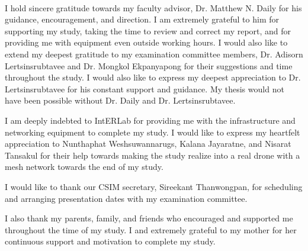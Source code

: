 
\setlength{\parindent}{0pt}
\setlength{\parskip}{1em}
\setlength{\baselineskip}{1.2em} %

\begin{center}
  \fontsize{14}{17} \\
\end{center}
\vspace{36pt} 

I hold sincere gratitude towards my faculty advisor, Dr. Matthew N. Daily for his guidance, encouragement, and direction. I am extremely grateful to him for supporting my study, taking the time to review and correct my report, and for providing me with equipment even outside working hours. I would also like to extend my deepest gratitude to my examination committee members, Dr. Adisorn Lertsinsrubtavee and Dr.  Mongkol Ekpanyapong for their suggestions and time throughout the study. I would also like to express my deepest appreciation to Dr. Lertsinsrubtavee for his constant support and guidance. My thesis would not have been possible without Dr. Daily and Dr. Lertsinsrubtavee. 

I am deeply indebted to IntERLab for providing me with the infrastructure and networking equipment to complete my study.  I would like to express my heartfelt appreciation to Nunthaphat Weshsuwannarugs, Kalana Jayaratne, and Nisarat Tansakul for their help towards making the study realize into a real drone with a mesh network towards the end of my study. 

I would like to thank our CSIM secretary, Sireekant Thanwongpan, for scheduling and arranging presentation dates with my examination committee.

I also thank my parents, family, and friends who encouraged and supported me throughout the time of my study. I and extremely grateful to my mother for her continuous support and motivation to complete my study.